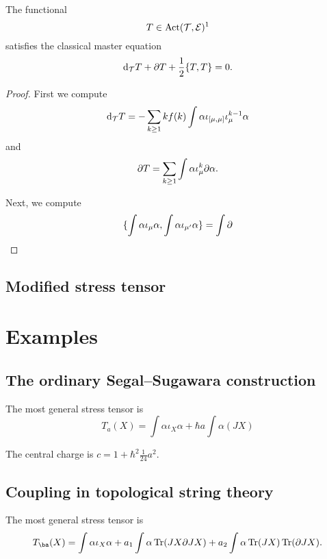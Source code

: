 \documentclass[11pt]{amsart}
\newcommand{\fields}{\cE}
\renewcommand{\op}{\operatorname}
\begin{document}
\begin{lem}
The functional
\begin{equation}
T \in \op{Act}(\cT,\fields)^1 
\end{equation}
satisfies the classical master equation
\begin{equation}
{\rm d}_{\mathcal T} T + \partial T + \frac12 \{T,T\} = 0 .
\end{equation}
\end{lem}
\begin{proof}
First we compute
\begin{equation}
{\rm d}_{\mathcal T} T = - \sum_{k \geq 1} k f(k) \int \alpha \iota_{[\mu,\mu]} \iota^{k-1}_\mu \alpha 
\end{equation}
and
\begin{equation}
\partial T = \sum_{k \geq 1} \int \alpha \iota_\mu^k \partial \alpha .
\end{equation}

Next, we compute
\begin{equation}
\{\int \alpha \iota_{\mu} \alpha, \int \alpha \iota_{\mu'} \alpha\} = \int \partial 
\end{equation}
\end{proof}

\subsection{Modified stress tensor}

\section{Examples}

\subsection{The ordinary Segal--Sugawara construction}

The most general stress tensor is
\begin{equation}
T_a(X) = \int \alpha \iota_X \alpha + \hbar a \int \alpha (J X)  
\end{equation}

The central charge is $c = 1 + \hbar^2 \frac{1}{24} a^2$.

\subsection{Coupling in topological string theory}

The most general stress tensor is
\begin{equation}
T_{\ba} (X) = \int \alpha \iota_X \alpha + a_1 \int \alpha \op{Tr}(J X \del J X) + a_2 \int \alpha \op{Tr}(J X) \op{Tr}(\del J X) .
\end{equation}
\end{document}
